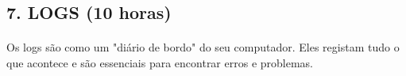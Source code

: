 \documentclass[10pt,a4paper]{article}
\newcommand{\guia}[1]{\textcolor{darkblue}{#1}} %
\begin{document}
	\guia{
	}
	\subsection*{7. LOGS (10 horas)}
	\vspace{-1.2em}
	\paragraph{}
	Os logs são como um "diário de bordo" do seu computador. Eles registam tudo o que acontece e são essenciais para encontrar erros e problemas.
	
\end{document}
